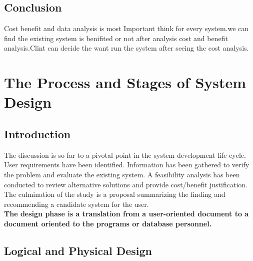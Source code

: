 \documentclass[a4paper,12pt]{report}
\begin{document}
\section{Conclusion}
Cost benefit and data analysis is most Important think for every system.we can find the existing system is benifited or not after analysis cost and benefit analysis.Clint can decide the want run the system after seeing the cost analysis.








\chapter{The Process and Stages of System Design}	
\section{Introduction}
The discussion is so far to a pivotal point in the system development life cycle. User requirements have been identified. Information has been gathered to verify the problem and evaluate the existing system. A feasibility analysis has been conducted to review alternative solutions and provide cost/benefit justification.  The culmination of the study is a proposal summarizing the finding and recommending a candidate system for the user.\\
\textbf{The design phase is a translation from a user-oriented document to a document oriented to the programs or database personnel.} 
\section{Logical and Physical Design}
\end{document}
